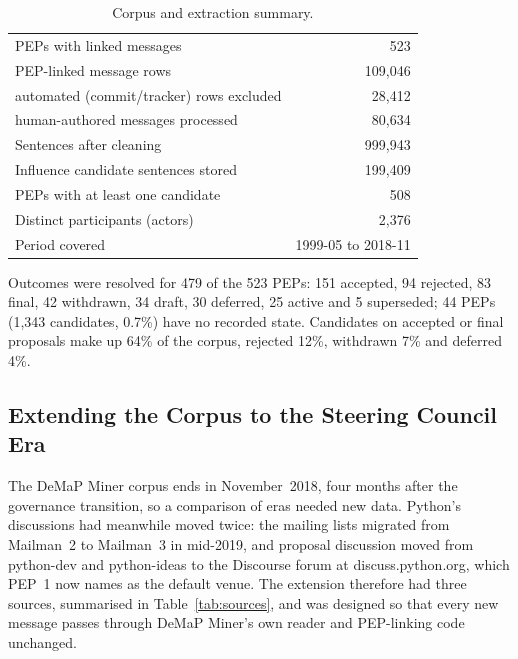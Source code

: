 \documentclass[sigconf,screen]{acmart}
\begin{document}
\begin{table}[t]
\caption{Corpus and extraction summary.}
\label{tab:corpus}
\begin{tabular}{lr}
\toprule
PEPs with linked messages & 523 \\
PEP-linked message rows & 109,046 \\
\quad automated (commit/tracker) rows excluded & 28,412 \\
\quad human-authored messages processed & 80,634 \\
Sentences after cleaning & 999,943 \\
Influence candidate sentences stored & 199,409 \\
PEPs with at least one candidate & 508 \\
Distinct participants (actors) & 2,376 \\
Period covered & 1999-05 to 2018-11 \\
\bottomrule
\end{tabular}
\end{table}

Outcomes were resolved for 479 of the 523 PEPs: 151 accepted, 94 rejected, 83 final, 42 withdrawn, 34 draft, 30 deferred, 25 active and 5 superseded; 44 PEPs (1,343 candidates, 0.7\%) have no recorded state. Candidates on accepted or final proposals make up 64\% of the corpus, rejected 12\%, withdrawn 7\% and deferred 4\%.


\subsection{Extending the Corpus to the Steering Council Era}
\label{sec:extension}

The DeMaP Miner corpus ends in November~2018, four months after the governance transition, so a comparison of eras needed new data. Python's discussions had meanwhile moved twice: the mailing lists migrated from Mailman~2 to Mailman~3 in mid-2019, and proposal discussion moved from python-dev and python-ideas to the Discourse forum at discuss.python.org, which PEP~1 now names as the default venue. The extension therefore had three sources, summarised in Table~\ref{tab:sources}, and was designed so that every new message passes through DeMaP Miner's own reader and PEP-linking code unchanged.
\end{document}
